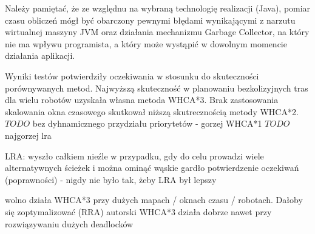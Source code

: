 Należy pamiętać, że ze względnu na wybraną technologię realizacji (Java), pomiar czasu obliczeń mógł być obarczony pewnymi błędami wynikającymi z narzutu wirtualnej maszyny JVM oraz działania mechanizmu Garbage Collector, na który nie ma wpływu programista, a który może wystąpić w dowolnym momencie działania aplikacji.

Wyniki testów potwierdziły oczekiwania w stosunku do skuteczności porównywanych metod.
Najwyższą skuteczność w planowaniu bezkolizyjnych tras dla wielu robotów uzyskała własna metoda WHCA*3.
Brak zastosowania skalowania okna czasowego skutkował niższą skutrecznością metody WHCA*2.
$TODO$ bez dyhnamicznego przydziału priorytetów - gorzej WHCA*1
$TODO$ najgorzej lra

LRA: wyszło całkiem nieźle w przypadku, gdy do celu prowadzi wiele alternatywnych ścieżek i można ominąć wąskie gardło
potwierdzenie oczekiwań (poprawności) - nigdy nie było tak, żeby LRA był lepszy

wolno działa WHCA*3 przy dużych mapach / oknach czasu / robotach. Dałoby się zoptymalizować (RRA)
autorski WHCA*3 działa dobrze nawet przy rozwiązywaniu dużych deadlocków
